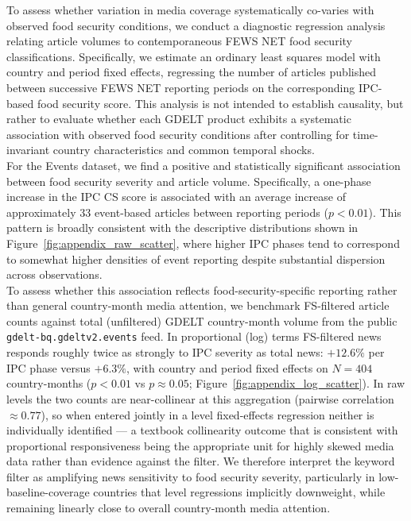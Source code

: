 \documentclass{article}
\providecommand{\FloatBarrier}{}
\begin{document}
\FloatBarrier

To assess whether variation in media coverage systematically co-varies with observed food security conditions, we conduct a diagnostic regression analysis relating article volumes to contemporaneous FEWS NET food security classifications. Specifically, we estimate an ordinary least squares model with country and period fixed effects, regressing the number of articles published between successive FEWS NET reporting periods on the corresponding IPC-based food security score. This analysis is not intended to establish causality, but rather to evaluate whether each GDELT product exhibits a systematic association with observed food security conditions after controlling for time-invariant country characteristics and common temporal shocks. \\

For the Events dataset, we find a positive and statistically significant association between food security severity and article volume. Specifically, a one-phase increase in the IPC CS score is associated with an average increase of approximately 33 event-based articles between reporting periods ($p < 0.01$). This pattern is broadly consistent with the descriptive distributions shown in Figure~\ref{fig:appendix_raw_scatter}, where higher IPC phases tend to correspond to somewhat higher densities of event reporting despite substantial dispersion across observations. \\

To assess whether this association reflects food-security-specific reporting rather than general country-month media attention, we benchmark FS-filtered article counts against total (unfiltered) GDELT country-month volume from the public \texttt{gdelt-bq.gdeltv2.events} feed. In proportional (log) terms FS-filtered news responds roughly twice as strongly to IPC severity as total news: $+12.6\%$ per IPC phase versus $+6.3\%$, with country and period fixed effects on $N=404$ country-months ($p<0.01$ vs $p\approx 0.05$; Figure~\ref{fig:appendix_log_scatter}). In raw levels the two counts are near-collinear at this aggregation (pairwise correlation $\approx 0.77$), so when entered jointly in a level fixed-effects regression neither is individually identified — a textbook collinearity outcome that is consistent with proportional responsiveness being the appropriate unit for highly skewed media data rather than evidence against the filter. We therefore interpret the keyword filter as amplifying news sensitivity to food security severity, particularly in low-baseline-coverage countries that level regressions implicitly downweight, while remaining linearly close to overall country-month media attention. \\
\end{document}
